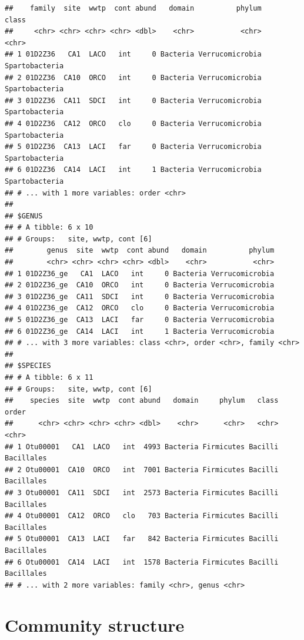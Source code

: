 \documentclass[letterpaper,12pt]{article}\usepackage[]{graphicx}\usepackage[]{color}
\makeatletter
\newenvironment{kframe}{%
 \def\at@end@of@kframe{}%
 \ifinner\ifhmode%
  \def\at@end@of@kframe{\end{minipage}}%
  \begin{minipage}{\columnwidth}%
 \fi\fi%
 \def\FrameCommand##1{\hskip\@totalleftmargin \hskip-\fboxsep
 \colorbox{shadecolor}{##1}\hskip-\fboxsep
     \hskip-\linewidth \hskip-\@totalleftmargin \hskip\columnwidth}%
 \MakeFramed {\advance\hsize-\width
   \@totalleftmargin\z@ \linewidth\hsize
   \@setminipage}}%
 {\par\unskip\endMakeFramed%
 \at@end@of@kframe}
\newenvironment{knitrout}{}{} %
\makeatother
\begin{document}
\begin{knitrout}
\begin{kframe}
\begin{verbatim}
##    family  site  wwtp  cont abund   domain          phylum          class
##     <chr> <chr> <chr> <chr> <dbl>    <chr>           <chr>          <chr>
## 1 01D2Z36   CA1  LACO   int     0 Bacteria Verrucomicrobia Spartobacteria
## 2 01D2Z36  CA10  ORCO   int     0 Bacteria Verrucomicrobia Spartobacteria
## 3 01D2Z36  CA11  SDCI   int     0 Bacteria Verrucomicrobia Spartobacteria
## 4 01D2Z36  CA12  ORCO   clo     0 Bacteria Verrucomicrobia Spartobacteria
## 5 01D2Z36  CA13  LACI   far     0 Bacteria Verrucomicrobia Spartobacteria
## 6 01D2Z36  CA14  LACI   int     1 Bacteria Verrucomicrobia Spartobacteria
## # ... with 1 more variables: order <chr>
## 
## $GENUS
## # A tibble: 6 x 10
## # Groups:   site, wwtp, cont [6]
##        genus  site  wwtp  cont abund   domain          phylum
##        <chr> <chr> <chr> <chr> <dbl>    <chr>           <chr>
## 1 01D2Z36_ge   CA1  LACO   int     0 Bacteria Verrucomicrobia
## 2 01D2Z36_ge  CA10  ORCO   int     0 Bacteria Verrucomicrobia
## 3 01D2Z36_ge  CA11  SDCI   int     0 Bacteria Verrucomicrobia
## 4 01D2Z36_ge  CA12  ORCO   clo     0 Bacteria Verrucomicrobia
## 5 01D2Z36_ge  CA13  LACI   far     0 Bacteria Verrucomicrobia
## 6 01D2Z36_ge  CA14  LACI   int     1 Bacteria Verrucomicrobia
## # ... with 3 more variables: class <chr>, order <chr>, family <chr>
## 
## $SPECIES
## # A tibble: 6 x 11
## # Groups:   site, wwtp, cont [6]
##    species  site  wwtp  cont abund   domain     phylum   class      order
##      <chr> <chr> <chr> <chr> <dbl>    <chr>      <chr>   <chr>      <chr>
## 1 Otu00001   CA1  LACO   int  4993 Bacteria Firmicutes Bacilli Bacillales
## 2 Otu00001  CA10  ORCO   int  7001 Bacteria Firmicutes Bacilli Bacillales
## 3 Otu00001  CA11  SDCI   int  2573 Bacteria Firmicutes Bacilli Bacillales
## 4 Otu00001  CA12  ORCO   clo   703 Bacteria Firmicutes Bacilli Bacillales
## 5 Otu00001  CA13  LACI   far   842 Bacteria Firmicutes Bacilli Bacillales
## 6 Otu00001  CA14  LACI   int  1578 Bacteria Firmicutes Bacilli Bacillales
## # ... with 2 more variables: family <chr>, genus <chr>
\end{verbatim}
\end{kframe}
\end{knitrout}

\section{Community structure}
 
\end{document}

